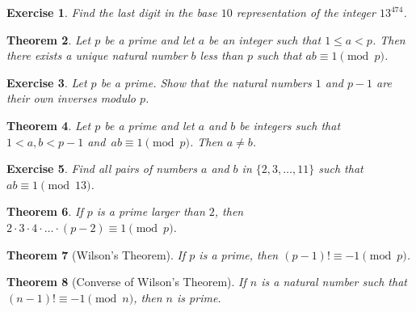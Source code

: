 \documentclass[11pt,leqno]{article}
\newtheorem{thm}{Theorem}[section]
\newtheorem{exer}[thm]{Exercise}
\theoremstyle{definition}
\begin{document}
\begin{exer}
Find the last digit in the base $10$ representation of the integer
$13^{474}$.
\end{exer}

\begin{thm}
Let $p$ be a prime and let $a$ be an integer such that $1 \leq a <
p$.  Then there exists a unique natural number $b$ less than $p$
such that $ab \equiv 1 \pmod{p}$.
\end{thm}

\begin{exer}
Let $p$ be a prime. Show that the natural numbers $1$ and $p-1$ are
their own inverses modulo $p$.
\end{exer}


\begin{thm}
Let $p$ be a prime and let $a$ and $b$ be integers such that $1 <
a,b < p-1$ and~\mbox{$ab \equiv 1 \pmod{p}$}. Then $a \neq b$.
\end{thm}

\begin{exer}
 Find all pairs of numbers $a$ and $b$ in
$\{2, 3, \dots, 11\}$ such that $ab \equiv 1 \pmod{13}$.
\end{exer}


\begin{thm}
If $p$ is a prime larger than $2$, then $2 \cdot 3 \cdot 4 \cdot
\hdots \cdot (p-2) \equiv 1 \pmod{p}$.
\end{thm}


\begin{thm}[Wilson's Theorem]
If $p$ is a prime, then $(p - 1)! \equiv -1 \pmod{p}$.
\end{thm}

\begin{thm}[Converse of Wilson's Theorem]
If $n$ is a natural number such that $(n - 1)! \equiv -1 \pmod{n}$,
then $n$ is prime.
\end{thm}
\end{document}
